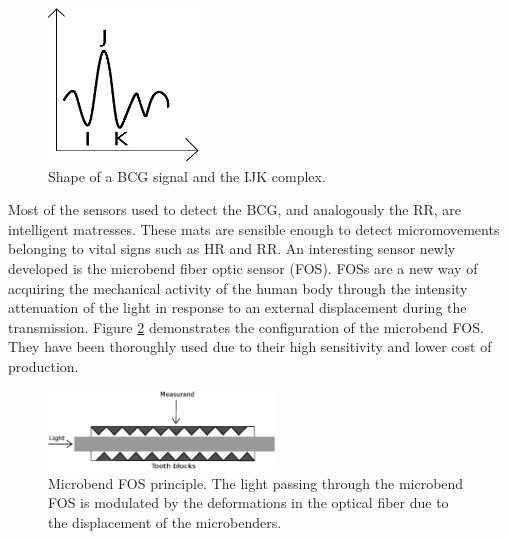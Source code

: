 \documentclass[twoside,twocolumn]{article}
\begin{document}
	\begin{figure}
		\hfill\includegraphics[width=4cm]{bcg.eps}\hspace*{\fill}
		\caption{ Shape of a BCG signal and the IJK complex.}
		\label{fig:bcg}
	\end{figure}
	
	Most of the sensors used to detect the BCG, and analogously the RR, are intelligent matresses. These mats are sensible enough to detect micromovements belonging to vital signs such as HR and RR.
	An interesting sensor newly developed is the microbend fiber optic sensor (FOS). FOSs are a new way of acquiring the mechanical activity of the human body through the intensity attenuation of the light in response to an external displacement during the transmission\cite{udd_overview_1995}. Figure \ref{fig:fos} demonstrates the configuration of the microbend FOS. They have been thoroughly used due to their high sensitivity and lower cost of production. 
	
	\begin{figure}
		\hfill\includegraphics[width=6cm]{fos.eps}\hspace*{\fill}
		\caption{ Microbend FOS principle. The light passing through the microbend FOS is modulated by the deformations in the optical fiber due to the displacement of the microbenders.}
		\label{fig:fos}
	\end{figure}
	
\end{document}
